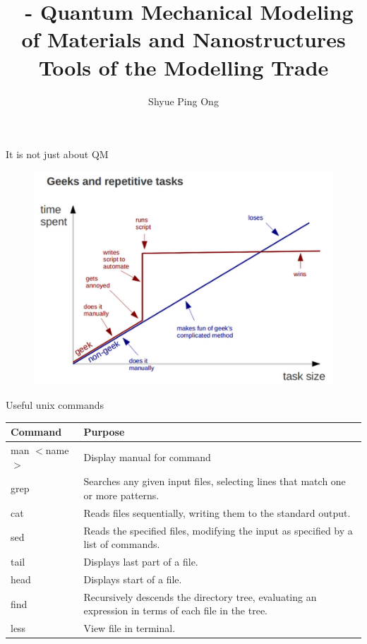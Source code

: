 \documentclass[aspectratio=169]{beamer}
\title[\classname Tools of the Modelling Trade]{\classname~- Quantum Mechanical Modeling of Materials and Nanostructures\\Tools of the Modelling Trade}
\author{Shyue Ping Ong}
\institute[UCSD]{University of California, San Diego\\
\medskip
}
\date{\classyear} %
\begin{document}
    \begin{frame}
        \titlepage %
    \end{frame}

    \begin{frame}{It is not just about QM}
        \begin{figure}
            \centering
            \centering
            \includegraphics[width=0.6\linewidth]{lectures/figures/9_geeks.png}

        \end{figure}
    \end{frame}

    \begin{frame}{Useful unix commands}

        \begin{table}[h]
            \centering
            \begin{tabular}{l|p{12cm}}

                \textbf{Command} & \textbf{Purpose}                                                                                     \\
                \hline
                man $<$name$>$   & Display manual for command                                                                           \\
                grep             & Searches any given input files, selecting lines that match one or more patterns.                     \\
                cat              & Reads files sequentially, writing them to the standard output.                                       \\
                sed              & Reads the specified files, modifying the input as specified by a list of commands.                   \\
                tail             & Displays last part of a file.                                                                        \\
                head             & Displays start of a file.                                                                            \\
                find             & Recursively descends the directory tree, evaluating an expression in terms of each file in the tree. \\
                less             & View file in terminal.
            \end{tabular}
        \end{table}

    \end{frame}
\end{document}
